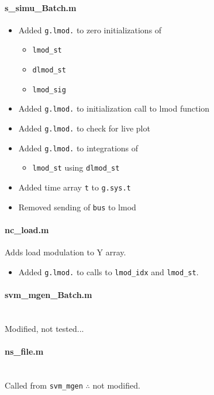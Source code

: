 \documentclass[12pt]{article}
\begin{document}
\paragraph{s\_simu\_Batch.m}
\begin{itemize}
\item Added \verb|g.lmod.| to zero initializations of
	\begin{itemize}
		\item \verb|lmod_st|
		\item \verb|dlmod_st|
		\item \verb|lmod_sig|
	\end{itemize}
\item Added \verb|g.lmod.| to initialization call to lmod function 
\item Added \verb|g.lmod.| to check for live plot


\item Added \verb|g.lmod.| to integrations of 
	\begin{itemize}
		\item \verb|lmod_st| using \verb|dlmod_st|
	\end{itemize}

\item Added time array \verb|t| to \verb|g.sys.t|

\item Removed sending of \verb|bus| to lmod
\end{itemize}

\paragraph{nc\_load.m}
Adds load modulation to Y array.
\begin{itemize}
\item Added \verb|g.lmod.| to calls to \verb|lmod_idx| and \verb|lmod_st|.
\end{itemize}

\paragraph{svm\_mgen\_Batch.m} \ \\
Modified, not tested...

\paragraph{ns\_file.m} \ \\
Called from \verb|svm_mgen| $\therefore$ not modified.
\end{document}
